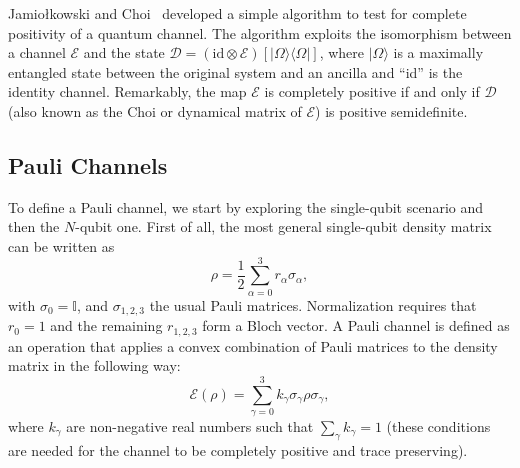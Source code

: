Jamiołkowski and Choi~\cite{choi,jamil} developed a simple algorithm to test for 
complete positivity of a quantum channel. 
The algorithm exploits the isomorphism between a channel $\mathcal{E}$ and the 
state $\mathcal{D} = (\text{id} \otimes \mathcal{E}) [|\Omega \rangle \langle  \Omega|]$, 
where $|\Omega\rangle$ is a maximally entangled state between the original system and an 
ancilla and “id” is the identity channel. 
Remarkably, the map $\mathcal{E}$ is completely positive if and 
only if $\mathcal{D}$ (also known as the Choi or dynamical matrix of $\mathcal{E}$) is positive semidefinite.


\subsection{Pauli Channels}
\label{subsec: Pauli Channels}

To define a Pauli channel, we start by exploring the single-qubit scenario and then the $N$-qubit one. 
First of all, the most general single-qubit density matrix can be written as
\begin{equation}
\label{ec: Density Matrix}
\rho = \dfrac{1}{2} \sum_{\alpha=0}^{3} r_{\alpha} \sigma_{\alpha},
\end{equation}
with $\sigma_0 = \mathbb{I}$, and $\sigma_{1,2,3}$ the usual Pauli matrices. 
Normalization requires that $r_0 = 1$ and the remaining $r_{1,2,3}$ form a Bloch vector. 
A Pauli channel is defined as an operation
that applies a convex combination of Pauli matrices to the density matrix in the following way:
\begin{equation}
\label{ec: Pauli channel 1 qbit}
\mathcal{E}(\rho) = \sum_{\gamma=0}^3 k_{\gamma} \sigma_{\gamma} \rho \sigma_{\gamma},
\end{equation}
where $k_{\gamma}$ are non-negative real numbers such that 
$\sum_{\gamma} k_{\gamma} = 1$ (these conditions are needed for the channel 
to be completely positive and trace preserving). 

